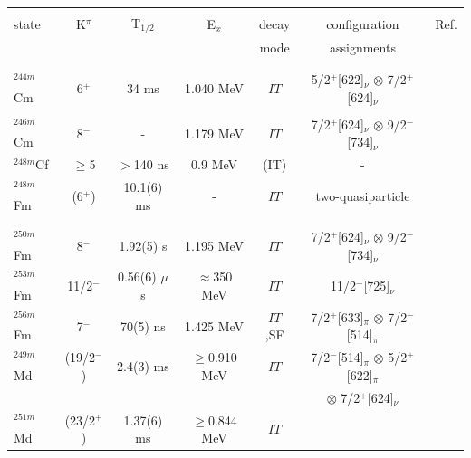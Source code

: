 \begin{center}
\begin{longtable}{lcccccl}
\\
\hline
\\
state & K$^\pi$&T$_{1/2}$& E$_x$   & decay & configuration& Ref.\\
        &        &         &         & mode  & assignments  &          \\
\\
\hline
\\
$^{244m}$Cm& 6$^+$  & 34 ms   &1.040 MeV& $IT$   &
    				  5/2$^+$[622]$_\nu$ $\otimes$ 7/2$^+$[624]$_\nu$  & \cite{Hoff1984}\\
          &        &         &         &            &                & \cite{Hansen1963}\\
$^{246m}$Cm& 8$^-$  &  -      &1.179 MeV& $IT$   &
                      7/2$^+$[624]$_\nu$ $\otimes$ 9/2$^-$[734]$_\nu$& \cite{Multhauf1976}\\
$^{248m}$Cf&$\geq $5& $>$140 ns&  0.9 MeV  & (IT)          &    -            & \cite{Orlandi2022}\\
$^{248m}$Fm& (6$^+$)&10.1(6) ms&  -   & $IT$   &   two-quasiparticle       & \cite{Ketelhut2010}\\
          &        &         &         &            &                & \cite{Herzberg2011}\\
          &        &         &         &            &                & \cite{Liu2014}\\
$^{250m}$Fm& 8$^-$  & 1.92(5) s  &1.195 MeV& $IT$   &
                      7/2$^+$[624]$_\nu$ $\otimes$ 9/2$^-$[734]$_\nu$& \cite{Greenlees2008}\\
$^{253m}$Fm& 11/2$^-$ & 0.56(6) $\mu$s  &  $\approx$350 MeV& $IT$   &
                      11/2$^-$[725]$_\nu$& \cite{Antalic2011}\\
$^{256m}$Fm& 7$^-$  & 70(5) ns   &1.425 MeV& $IT$,SF&
                      7/2$^+$[633]$_\pi$ $\otimes$ 7/2$^-$[514]$_\pi$& \cite{Hall1989}\\
$^{249m}$Md& (19/2$^-$)     & 2.4(3) ms   &$\geq$0.910 MeV& $IT$&
                      7/2$^-$[514]$_\pi$ $\otimes$ 5/2$^+$[622]$_\pi$ &\cite{Goigoux2021}\\ 
          &                &             &&&$\otimes$ 7/2$^+$[624]$_\nu$& \\
$^{251m}$Md& (23/2$^+$)       & 1.37(6) ms  &$\geq$0.844 MeV& $IT$&

\end{longtable}
\end{center}
